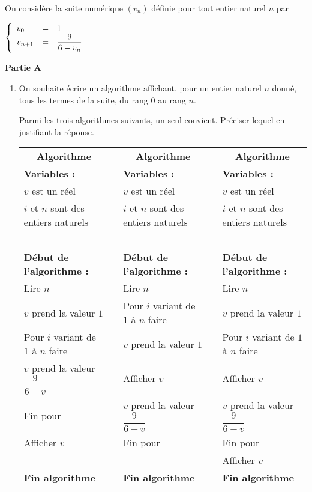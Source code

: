 On considère la suite numérique $\left(v_{n}\right)$ définie pour tout entier naturel $n$ par 

$\left\{\begin{array}{l c l}
v_{0} &=& 1\\ 	 
v_{n + 1}&=& \dfrac{9}{6 - v_{n}}
\end{array}\right.$ 

\bigskip

\textbf{Partie A}

\medskip
 
\begin{enumerate}
\item On souhaite écrire un algorithme  affichant, pour un entier naturel $n$ donné, tous les termes de la suite, du rang $0$ au rang $n$.
 
Parmi les trois algorithmes suivants, un seul convient. Préciser lequel en justifiant la réponse.

\medskip

\hspace{-1cm} 
\begin{small}
\begin{tabularx}{1.1\linewidth}{|X|c|X|c|X|}\cline{1-1}\cline{3-3}\cline{5-5}
\multicolumn{1}{|c|}{\textbf{Algorithme \No 1}}&&\multicolumn{1}{|c|}{\textbf{Algorithme \No 2}}&&\multicolumn{1}{|c|}{\textbf{Algorithme \No 3}}\\ \cline{1-1}\cline{3-3}\cline{5-5}
\textbf{Variables :}&&\textbf{Variables :}&&\textbf{Variables :}\\
$v$ est un réel&&$v$ est un réel&&$v$ est un réel\\ 
$i$ et $n$ sont des entiers naturels&&$i$ et $n$ sont des entiers naturels&&$i$ et $n$ sont des entiers naturels\\
~&&&&\\ 
\textbf{Début de l'algorithme :}&&\textbf{Début de l'algorithme :}&& \textbf{Début de l'algorithme :}\\ 
Lire $n$&&Lire $n$&&Lire $n$\\ 
$v$ prend la valeur $1$&&Pour $i$ variant de $1$ à $n$ faire&&$v$ prend la valeur $1$\\ 
Pour $i$ variant de $1$ à $n$ faire&&$v$ prend la valeur $1$&& Pour $i$ variant de $1$ à $n$ faire\\ 
\hspace{0.2cm}$v$ prend la valeur $\dfrac{9}{6 - v}$&&\hspace{0.2cm}Afficher $v$&& \hspace{0.2cm}Afficher $v$\\  
Fin pour&&$v$ prend la valeur $\dfrac{9}{6 - v}$&&$v$ prend la valeur $\dfrac{9}{6 - v}$\\
Afficher $v$&&Fin pour&&Fin pour\\
&&&&Afficher $v$\\
\textbf{Fin algorithme}&&\textbf{Fin algorithme}&&\textbf{Fin algorithme}\\  \cline{1-1}\cline{3-3}\cline{5-5}
\end{tabularx}
\end{small}


\end{enumerate}
